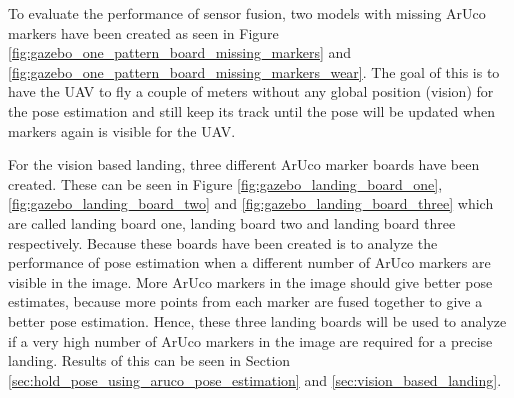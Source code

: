 \documentclass[../Head/report.tex]{subfiles}
\begin{document}
To evaluate the performance of sensor fusion, two models with missing ArUco markers have been created as seen in Figure \ref{fig:gazebo_one_pattern_board_missing_markers} and \ref{fig:gazebo_one_pattern_board_missing_markers_wear}. The goal of this is to have the UAV to fly a couple of meters without any global position (vision) for the pose estimation and still keep its track until the pose will be updated when markers again is visible for the UAV.

For the vision based landing, three different ArUco marker boards have been created. These can be seen in Figure \ref{fig:gazebo_landing_board_one}, \ref{fig:gazebo_landing_board_two} and \ref{fig:gazebo_landing_board_three} which are called landing board one, landing board two and landing board three respectively. Because these boards have been created is to analyze the performance of pose estimation when a different number of ArUco markers are visible in the image. More ArUco markers in the image should give better pose estimates, because more points from each marker are fused together to give a better pose estimation. Hence, these three landing boards will be used to analyze if a very high number of ArUco markers in the image are required for a precise landing. Results of this can be seen in Section \ref{sec:hold_pose_using_aruco_pose_estimation} and \ref{sec:vision_based_landing}. 
\end{document}
